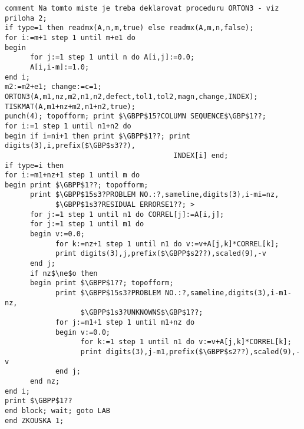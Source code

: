 \begin{lstlisting}[mathescape]
comment Na tomto miste je treba deklarovat proceduru ORTON3 - viz priloha 2;
if type=1 then readmx(A,n,m,true) else readmx(A,m,n,false);
for i:=m+1 step 1 until m+e1 do
begin
      for j:=1 step 1 until n do A[i,j]:=0.0;
      A[i,i-m]:=1.0;
end i;
m2:=m2+e1; change:=c=1;
ORTON3(A,m1,nz,m2,n1,n2,defect,tol1,tol2,magn,change,INDEX);
TISKMAT(A,m1+nz+m2,n1+n2,true);
punch(4); topofform; print $\GBPP$15?COLUMN SEQUENCE$\GBP$1??;
for i:=1 step 1 until n1+n2 do
begin if i=ni+1 then print $\GBPP$1??; print digits(3),i,prefix($\GBP$s3??),
                                        INDEX[i] end;
if type=i then
for i:=m1+nz+1 step 1 until m do
begin print $\GBPP$1??; topofform;
      print $\GBPP$15s3?PROBLEM NO.:?,sameline,digits(3),i-mi=nz,
            $\GBPP$1s3?RESIDUAL ERRORSE1??; >
      for j:=1 step 1 until n1 do CORREL[j]:=A[i,j];
      for j:=1 step 1 until m1 do
      begin v:=0.0;
            for k:=nz+1 step 1 until n1 do v:=v+A[j,k]*CORREL[k];
            print digits(3),j,prefix($\GBPP$s2??),scaled(9),-v
      end j;
      if nz$\ne$o then
      begin print $\GBPP$1??; topofform;
            print $\GBPP$15s3?PROBLEM NO.:?,sameline,digits(3),i-m1-nz,
                  $\GBPP$1s3?UNKNOWNS$\GBP$1??;
            for j:=m1+1 step 1 until m1+nz do
            begin v:=0.0;
                  for k:=1 step 1 until n1 do v:=v+A[j,k]*CORREL[k];
                  print digits(3),j-m1,prefix($\GBPP$s2??),scaled(9),-v
            end j;
      end nz;
end i;
print $\GBPP$1??
end block; wait; goto LAB
end ZKOUSKA 1;



\end{lstlisting}
